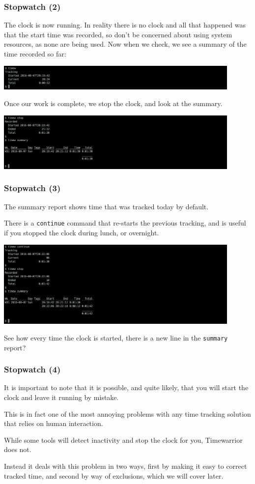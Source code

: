 \documentclass[t,handout]{beamer}
\begin{document}
\begin{frame}[fragile]\frametitle{Stopwatch (2)}
    \vfill
    The clock is now running. In reality there is no clock and all that happened was that the start time was recorded, so don't be concerned about using system resources, as none are being used. Now when we check, we see a summary of the time recorded so far:

    \includegraphics[width=12cm]{images/tutorial5.png}

    Once our work is complete, we stop the clock, and look at the summary.

    \includegraphics[width=12cm]{images/tutorial6.png}
\end{frame}

\begin{frame}[fragile]\frametitle{Stopwatch (3)}
    \vfill
    The summary report shows time that was tracked today by default.

    There is a \verb=continue= command that re-starts the previous tracking, and is useful if you stopped the clock during lunch, or overnight.

    \includegraphics[width=12cm]{images/tutorial7.png}

    See how every time the clock is started, there is a new line in the \verb=summary= report?
\end{frame}

\begin{frame}[fragile]\frametitle{Stopwatch (4)}
    \vfill
    It is important to note that it is possible, and quite likely, that you will start the clock and leave it running by mistake.

    This is in fact one of the most annoying problems with any time tracking solution that relies on human interaction.

    While some tools will detect inactivity and stop the clock for you, Timewarrior does not.

    Instead it deals with this problem in two ways, first by making it easy to correct tracked time, and second by way of exclusions, which we will cover later.
\end{frame}
\end{document}
